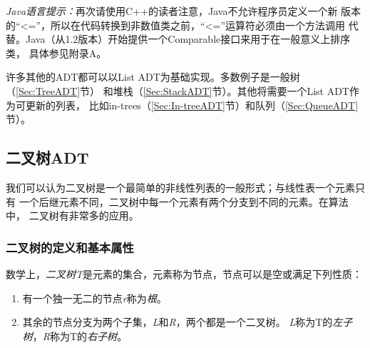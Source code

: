 \begin{example}
\textit{Java语言提示：}再次请使用C++的读者注意，Java不允许程序员定义一个新
版本的“<=”，所以在代码转换到非数值类之前，“<=”运算符必须由一个方法调用
代替。Java（从1.2版本）开始提供一个Comparable接口来用于在一般意义上排序类，
具体参见附录A。

许多其他的ADT都可以以List ADT为基础实现。多数例子是一般树（\ref{Sec:TreeADT}节）
和堆栈（\ref{Sec:StackADT}节）。其他将需要一个List ADT作为可更新的列表，
比如in-trees（\ref{Sec:In-treeADT}节）和队列（\ref{Sec:QueueADT}节）。

\end{example}

\subsection{二叉树ADT}\label{Sec:BinaryTreeADT}
我们可以认为二叉树是一个最简单的非线性列表的一般形式；与线性表一个元素只有
一个后继元素不同，二叉树中每一个元素有两个分支到不同的元素。在算法中，
二叉树有非常多的应用。

\subsubsection{二叉树的定义和基本属性}
数学上，\emph{二叉树T}是元素的集合，元素称为节点，节点可以是空或满足下列性质：
\begin{enumerate}
    \item 有一个独一无二的节点\emph{r}称为\emph{根}。
    \item 其余的节点分支为两个子集，\emph{L}和\emph{R}，两个都是一个二叉树。
            \emph{L}称为T的\emph{左子树}，\emph{R}称为T的\emph{右子树}。
\end{enumerate}

